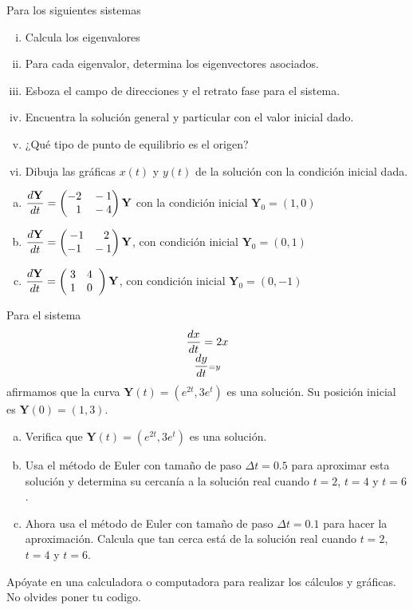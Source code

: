 \documentclass[12pt]{exam}
\newcommand*\colvec[3][]{
    \begin{pmatrix}\ifx\relax#1\relax\else#1\\\fi#2\\#3\end{pmatrix}
}
\begin{document}
    
    \begin{questions}
    
     \question%
     Para los siguientes sistemas
     \begin{enumerate}[i.]
         \item Calcula los eigenvalores
         \item Para cada eigenvalor, determina los eigenvectores asociados.
         \item Esboza el campo de direcciones y el retrato fase para el sistema.
         \item Encuentra la solución general y particular con el valor inicial dado.
         \item ¿Qué tipo de punto de equilibrio es el origen?
         \item Dibuja las gráficas $x(t)$ y $y(t)$ de la solución con la condición inicial dada.
     \end{enumerate}
    \vskip 20pt
    
    \begin{enumerate}[a)]
        \item $\dfrac{d\mathbf{Y}}{dt}=\colvec{-2\quad-1}{\phantom{-}1\quad-4}\mathbf{Y}$ con la condición inicial $\mathbf{Y}_0=(1,0)$
        \item $\dfrac{d\mathbf{Y}}{dt}=\colvec{-1\quad\phantom{-}2}{-1\quad-1}\mathbf{Y}$, con condición inicial $\mathbf{Y}_0=(0,1)$
        \item $\dfrac{d\mathbf{Y}}{dt}=\colvec{\;3\quad4\;\;}{\;1\quad0\;\;}\mathbf{Y}$, con condición inicial $\mathbf{Y}_0=(0,-1)$
    \end{enumerate}

    
     \question%
     Para el sistema $$\dfrac{dx}{dt}=2x\atop \dfrac{dy}{dt}=y$$
     afirmamos que la curva $\mathbf{Y}(t)=(e^{2t},3e^t)$ es una solución. Su posición inicial es $\mathbf{Y}(0)=(1,3)$.
     \begin{enumerate}[a)]
         \item Verifica que $\mathbf{Y}(t)=(e^{2t},3e^t)$ es una solución.
         \item Usa el método de Euler con tamaño de paso $\Delta t=0.5$ para aproximar esta solución y determina su cercanía a la solución real cuando $t=2$, $t=4$ y $t=6$.
         \item Ahora usa el método de Euler con tamaño de paso $\Delta t=0.1$ para hacer la aproximación. Calcula que tan cerca está de la solución real cuando $t=2$, $t=4$ y $t=6$.
     \end{enumerate}
     Apóyate en una calculadora o computadora para realizar los cálculos y gráficas. No olvides poner tu codigo.


\end{questions}
\end{document}
